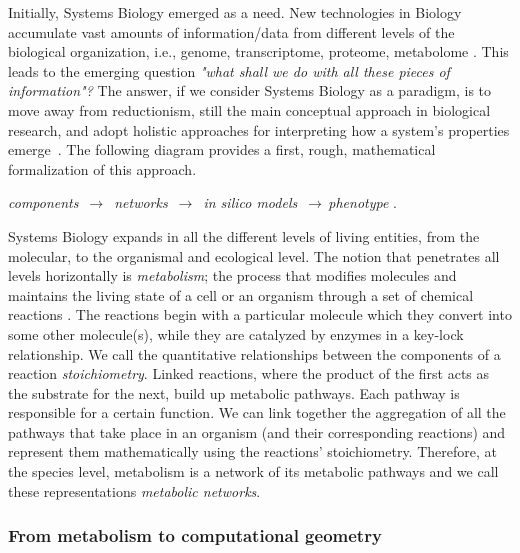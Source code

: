    Initially, Systems Biology emerged as a need. New technologies in Biology
   accumulate vast amounts of information/data from different levels of the
   biological organization, i.e., genome, transcriptome, proteome, metabolome
   \cite{quinn2016sample}. This leads to the emerging question \textit{"what shall
   we do with all these pieces of information"?} The answer, if we consider
   Systems Biology as a paradigm, is to move away from reductionism, still the main
   conceptual approach in biological research, and adopt holistic approaches for
   interpreting how a system's properties emerge~\cite{noble2008music}. The
   following diagram provides a first, rough, mathematical formalization of this
   approach.

   \begin{center}
   \textit{components} $\,\to\,$ \textit{networks} $\,\to\,$ \textit{in silico models} $\,\to\,$\textit{phenotype} \cite{palsson2015systems}. \\ \end{center}

   Systems Biology expands in all the different levels of living entities, from the
   molecular, to the organismal and ecological level. The notion that
   penetrates all levels horizontally is \emph{metabolism}; the
   process that modifies molecules and  maintains the living state of a
   cell or an organism through a set of chemical reactions
   \cite{schramski2015metabolic}. The reactions begin with a particular molecule
   which they convert into some other molecule(s), while they are catalyzed by
   enzymes in a key-lock relationship.
   We call the quantitative relationships between the components of a reaction   \emph{stoichiometry}.
   Linked reactions, where the product of the first acts as the substrate for the
   next, build up metabolic pathways. Each pathway is responsible for a certain
   function. We can link together the aggregation of all the pathways that take
   place in an organism (and their corresponding reactions)
   and represent them mathematically using  the reactions' stoichiometry.
   Therefore, at the species level, metabolism is a network of its metabolic pathways and we call
   these representations \emph{metabolic networks}.


   \subsubsection*{From metabolism to computational geometry}

